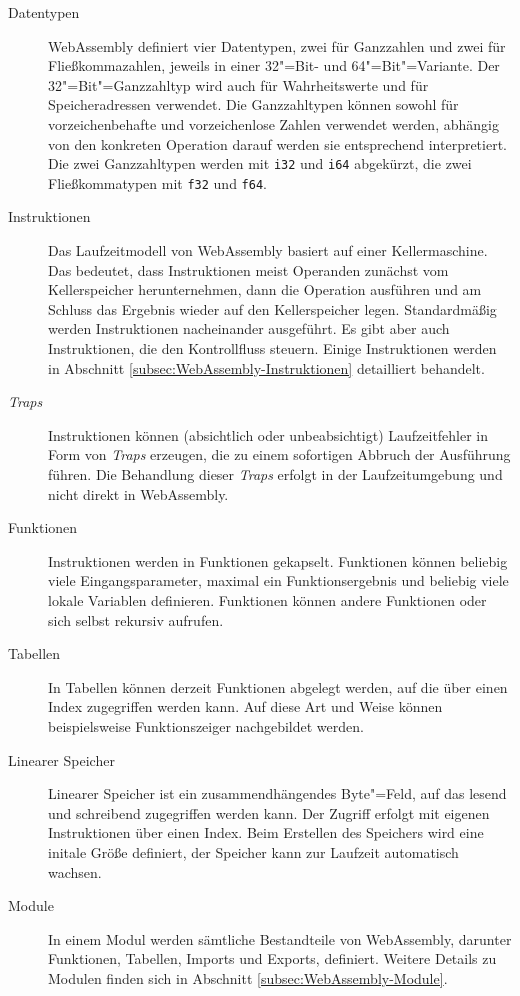 \begin{description}
    \item[Datentypen] WebAssembly definiert vier Datentypen, zwei für Ganzzahlen und zwei für Fließkommazahlen, jeweils in einer 32"=Bit- und 64"=Bit"=Variante. Der 32"=Bit"=Ganzzahltyp wird auch für Wahrheitswerte und für Speicheradressen verwendet. Die Ganzzahltypen können sowohl für vorzeichenbehafte und vorzeichenlose Zahlen verwendet werden, abhängig von den konkreten Operation darauf werden sie entsprechend interpretiert. Die zwei Ganzzahltypen werden mit \lstinline{i32} und \lstinline{i64} abgekürzt, die zwei Fließkommatypen mit \lstinline{f32} und \lstinline{f64}.
    \item[Instruktionen] Das Laufzeitmodell von WebAssembly basiert auf einer Kellermaschine. Das bedeutet, dass Instruktionen meist Operanden zunächst vom Kellerspeicher herunternehmen, dann die Operation ausführen und am Schluss das Ergebnis wieder auf den Kellerspeicher legen. Standardmäßig werden Instruktionen nacheinander ausgeführt. Es gibt aber auch Instruktionen, die den Kontrollfluss steuern. Einige Instruktionen werden in Abschnitt \ref{subsec:WebAssembly-Instruktionen} detailliert behandelt.
    \item[\emph{Traps}] Instruktionen können (absichtlich oder unbeabsichtigt) Laufzeitfehler in Form von \emph{Traps} erzeugen, die zu einem sofortigen Abbruch der Ausführung führen. Die Behandlung dieser \emph{Traps} erfolgt in der Laufzeitumgebung und nicht direkt in WebAssembly.
    \item[Funktionen] Instruktionen werden in Funktionen gekapselt. Funktionen können beliebig viele Eingangsparameter, maximal ein Funktionsergebnis und beliebig viele lokale Variablen definieren. Funktionen können andere Funktionen oder sich selbst rekursiv aufrufen.
    \item[Tabellen] In Tabellen können derzeit Funktionen abgelegt werden, auf die über einen Index zugegriffen werden kann. Auf diese Art und Weise können beispielsweise Funktionszeiger nachgebildet werden. 
    \item[Linearer Speicher] Linearer Speicher ist ein zusammendhängendes Byte"=Feld, auf das lesend und schreibend zugegriffen werden kann. Der Zugriff erfolgt mit eigenen Instruktionen über einen Index. Beim Erstellen des Speichers wird eine initale Größe definiert, der Speicher kann zur Laufzeit automatisch wachsen.
    \item[Module] In einem Modul werden sämtliche Bestandteile von WebAssembly, darunter Funktionen, Tabellen, Imports und Exports, definiert. Weitere Details zu Modulen finden sich in Abschnitt \ref{subsec:WebAssembly-Module}.
\end{description}

